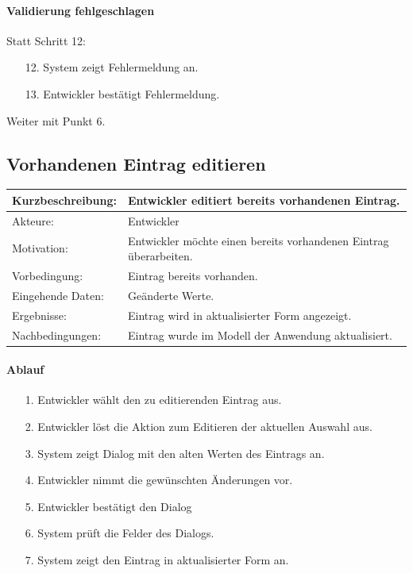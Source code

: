 \paragraph{Validierung fehlgeschlagen}
Statt Schritt 12:
\begin{itemize}
\item[12.] System zeigt Fehlermeldung an. 
\item[13.] Entwickler bestätigt Fehlermeldung. 
\end{itemize}
Weiter mit Punkt 6. 


\subsection{Vorhandenen Eintrag editieren}
\label{sec:edit_entry}

\begin{tabular}[h]{|p{4cm}|p{}|}
\hline 
\rule[-1ex]{0pt}{2.5ex}Kurzbeschreibung: & 
Entwickler editiert bereits vorhandenen Eintrag. \\  
\hline 
\rule[-1ex]{0pt}{2.5ex}Akteure: & 
Entwickler \\ 
\hline 
\rule[-1ex]{0pt}{2.5ex}Motivation: & 
Entwickler möchte einen bereits vorhandenen Eintrag überarbeiten. \\ 
\hline 
\rule[-1ex]{0pt}{2.5ex}Vorbedingung: & 
Eintrag bereits vorhanden. \\ 
\hline 
\rule[-1ex]{0pt}{2.5ex}Eingehende Daten: & Geänderte Werte. \\ 
\hline 
\rule[-1ex]{0pt}{2.5ex}Ergebnisse: & Eintrag wird in aktualisierter Form angezeigt. \\ 
\hline 
\rule[-1ex]{0pt}{2.5ex}Nachbedingungen: & Eintrag wurde im Modell der Anwendung aktualisiert.  \\ 
\hline 
\end{tabular} 

\paragraph{Ablauf}

\begin{itemize}[itemsep=0pt]
\item[1.] Entwickler wählt den zu editierenden Eintrag aus.
\item[2.] Entwickler löst die Aktion zum Editieren der aktuellen Auswahl aus. 
\item[3.] System zeigt Dialog mit den alten Werten des Eintrags an.
\item[4.] Entwickler nimmt die gewünschten Änderungen vor.
\item[5.] Entwickler bestätigt den Dialog
\item[6.] System prüft die Felder des Dialogs.
\item[7.] System zeigt den Eintrag in aktualisierter Form an.
\end{itemize}

